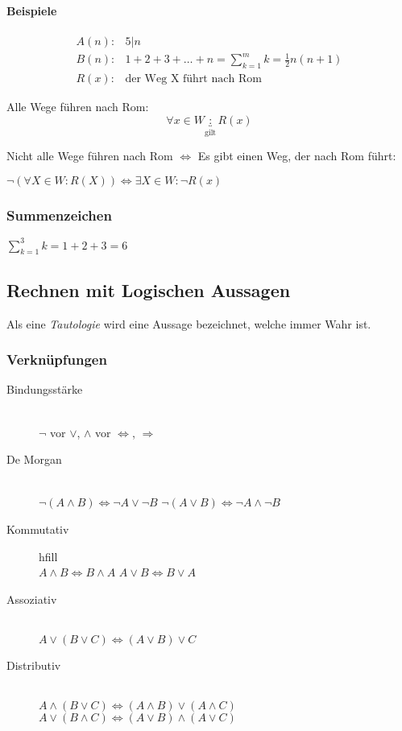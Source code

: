 \begin{multicols}{2}
	\paragraph{Beispiele}
		\begin{align*}
		A(n): & 5 | n \\
		B(n): & 1+2+3+\dots+n = \sum_{k=1}^{m}k = \frac{1}{2} n (n+1) \\
		R(x): & \text{der Weg X führt nach Rom}
		\end{align*}
		
		Alle Wege führen nach Rom:
		\[
		\forall x \in W \underbracket{:}_\text{gilt} R(x)
		\]
		
		Nicht alle Wege führen nach Rom $\Leftrightarrow$ Es gibt einen Weg, der nach Rom führt:
		
		$\neg \left(\forall X \in W : R\left(X\right)\right) \Leftrightarrow \exists X \in W : \neg R(x)$
	

\subsubsection{Summenzeichen}

	$ \sum_{k=1}^{3} k = 1+2+3 = 6$

\subsection{Rechnen mit Logischen Aussagen}

Als eine \emph{Tautologie} wird eine Aussage bezeichnet, welche immer Wahr ist.

	
\subsubsection{Verknüpfungen}

	\begin{description}

		\item[Bindungsstärke] \hfill \\$\neg$ vor $\lor$, $\land$ vor $\Leftrightarrow$, $\Rightarrow$
		\item[De Morgan]\hfill \\ $\neg (A \land B) \Leftrightarrow \neg A \lor \neg B$ \newline $\neg (A \lor B) \Leftrightarrow \neg A \land \neg B$
		\item[Kommutativ] hfill \\ $A \land B \Leftrightarrow B \land A$ $A \lor B \Leftrightarrow B \lor A$
		\item[Assoziativ] \hfill \\ $A \lor (B \lor C) \Leftrightarrow (A \lor B) \lor C$
		\item[Distributiv] \hfill \\ $A \land (B \lor C) \Leftrightarrow (A \land B) \lor (A \land C)$ \newline $A \lor (B \land C) \Leftrightarrow (A \lor B) \land (A \lor C)$ 


\end{description}
\end{multicols}
